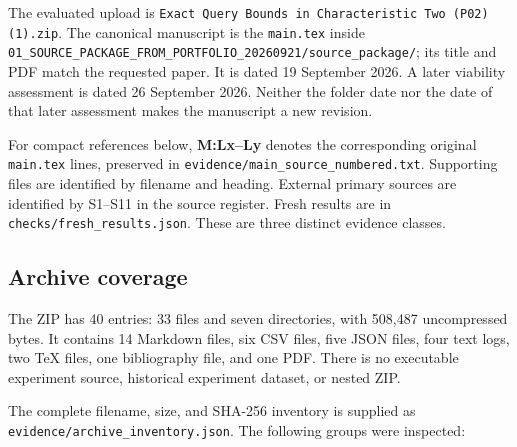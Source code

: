 \documentclass[
  11pt,
]{article}
\begin{document}
The evaluated upload is
\nolinkurl{Exact Query Bounds in Characteristic Two (P02)(1).zip}. The
canonical manuscript is the \nolinkurl{main.tex} inside
\nolinkurl{01_SOURCE_PACKAGE_FROM_PORTFOLIO_20260921/source_package/};
its title and PDF match the requested paper. It is dated 19 September
2026. A later viability assessment is dated 26 September 2026. Neither
the folder date nor the date of that later assessment makes the
manuscript a new revision.

For compact references below, \textbf{M:Lx--Ly} denotes the
corresponding original \nolinkurl{main.tex} lines, preserved in
\nolinkurl{evidence/main_source_numbered.txt}. Supporting files are
identified by filename and heading. External primary sources are
identified by S1--S11 in the source register. Fresh results are in
\nolinkurl{checks/fresh_results.json}. These are three distinct evidence
classes.

\subsection{Archive coverage}\label{archive-coverage}

The ZIP has 40 entries: 33 files and seven directories, with 508,487
uncompressed bytes. It contains 14 Markdown files, six CSV files, five
JSON files, four text logs, two TeX files, one bibliography file, and
one PDF. There is no executable experiment source, historical experiment
dataset, or nested ZIP.

The complete filename, size, and SHA-256 inventory is supplied as
\nolinkurl{evidence/archive_inventory.json}. The following groups were
inspected:
\end{document}

